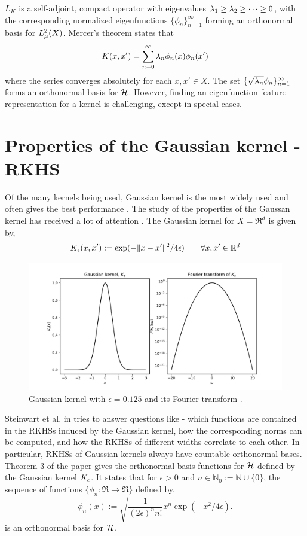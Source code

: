  $L_K$ is a self-adjoint, compact operator with eigenvalues $\lambda_1 \geq \lambda_2 \geq \cdots \geq 0$, with the corresponding normalized eigenfunctions $\{\phi_n\}_{n=1}^\infty$ forming an orthonormal basis for $L^2_\mu(X)$. Mercer's theorem states that 
\[
K(x,x') = \sum_{n=0}^\infty \lambda_n \phi_n(x) \phi_n(x')
\]
where the series converges absolutely for each $x,x' \in X$. The set $\{\sqrt{\lambda_n}\phi_n\}_{n=1}^\infty$ forms an orthonormal basis for ${\cal H}$. However, finding an eigenfunction feature representation for a kernel is challenging, except in special cases. 

\section{Properties of the Gaussian kernel -  RKHS}
\label{s:gaussian_rkhs}

Of the many kernels being used, Gaussian kernel is the most widely used and often gives the best performance \cite{min10}. The study of the properties of the Gaussan kernel has received a lot of attention \cite{stehussco06, min10,micchaxuzha06}. The Gaussian kernel for $X = \Re^d$ is given by,
\[
K_{\epsilon}(x,x') := \exp(-\|x - x'\|^2/ 4\epsilon) \qquad \forall x,x' \in \mathbb{R}^d
\]

\begin{figure}[htbp]
	\centering
	\includegraphics[width=6in]{images/Chap3_Gaussian_kernel}
	\caption{Gaussian kernel with $\epsilon = 0.125$ and its Fourier transform \cite{schsmo01}.}
	\label{fig:gaussian_kernel}
\end{figure}

Steinwart et al. in \cite{stehussco06} tries to answer questions like - which functions are contained in the RKHSs induced by the Gaussian kernel, how the corresponding norms can be computed, and how the RKHSs of different widths correlate to each other. 
In particular, RKHSs of Gaussian kernels always have countable orthonormal bases. Theorem 3 of the paper gives the orthonormal basis functions for ${\cal H}$ defined by the Gaussian kernel $K_\epsilon$. It states that for $\epsilon >0$ and $n \in \mathbb{N}_0 := \mathbb{N} \cup \{0\}$, the sequence of functions $\{\phi_n : \Re \to \Re\}$ defined by,
\[
\phi_n(x) := \sqrt{\frac{1}{(2\epsilon)^n n!}}x^n \exp(-x^2/4\epsilon).
\]
is an orthonormal basis for ${\cal H}$.

